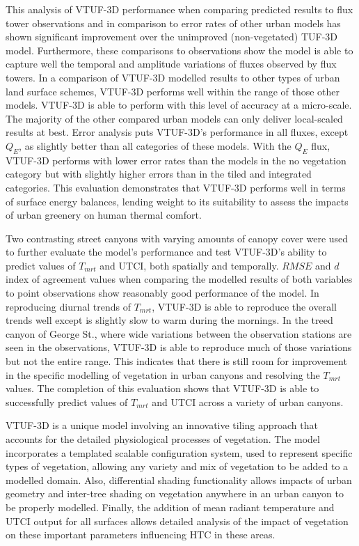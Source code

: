 \documentclass[final,3p,times,authoryear]{elsarticle}
\begin{document}
This analysis of VTUF-3D performance when comparing predicted results to flux tower observations and in comparison to error rates of other urban models has shown significant improvement over the unimproved (non-vegetated) TUF-3D model. Furthermore, these comparisons to observations show the model is able to capture well the temporal and amplitude variations of fluxes observed by flux towers. In a comparison of VTUF-3D modelled results to other types of urban land surface schemes, VTUF-3D performs well within the range of those other models. VTUF-3D is able to perform with this level of accuracy at a micro-scale. The majority of the other compared urban models can only deliver local-scaled results at best. Error analysis puts VTUF-3D's performance in all fluxes, except $Q_{E}$, as slightly better than all categories of these models. With the $Q_{E}$ flux, VTUF-3D performs with lower error rates than the models in the no vegetation category but with slightly higher errors than in the tiled and integrated categories. This evaluation demonstrates that VTUF-3D performs well in terms of surface energy balances, lending weight to its suitability to assess the impacts of urban greenery on human thermal comfort.

Two contrasting street canyons with varying amounts of canopy cover were used to further evaluate the model's performance and test VTUF-3D's ability to predict values of $T_{mrt}$ and UTCI, both spatially and temporally. $RMSE$ and $d$ index of agreement values when comparing the modelled results of both variables to point observations show reasonably good performance of the model. In reproducing diurnal trends of $T_{mrt}$, VTUF-3D is able to reproduce the overall trends well except is slightly slow to warm during the mornings. In the treed canyon of George St., where wide variations between the observation stations are seen in the observations, VTUF-3D is able to reproduce much of those variations but not the entire range. This indicates that there is still room for improvement in the specific modelling of vegetation in urban canyons and resolving the $T_{mrt}$ values. The completion of this evaluation shows that VTUF-3D is able to successfully predict values of $T_{mrt}$ and UTCI across a variety of urban canyons.

VTUF-3D is a unique model involving an innovative tiling approach that accounts for the detailed physiological processes of vegetation. The model incorporates a templated scalable configuration system, used to represent specific types of vegetation, allowing any variety and mix of vegetation to be added to a modelled domain. Also, differential shading functionality allows impacts of urban geometry and inter-tree shading on vegetation anywhere in an urban canyon to be properly modelled. Finally, the addition of mean radiant temperature and UTCI output for all surfaces allows detailed analysis of the impact of vegetation on these important parameters influencing HTC in these areas.
\end{document}
